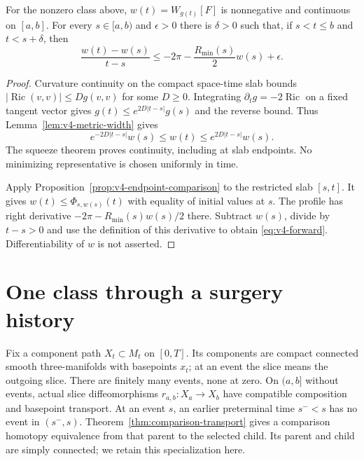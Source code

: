 \begin{proposition}
\label{prop:v4-smooth-time}
For the nonzero class above, $w(t)=W_{g(t)}[F]$ is nonnegative and
continuous on $[a,b]$. For every $s\in[a,b)$ and $\epsilon>0$ there
is $\delta>0$ such that, if $s<t\leq b$ and $t<s+\delta$, then
\begin{equation}
 \frac{w(t)-w(s)}{t-s}
 \leq-2\pi-\frac{R_{\min}(s)}2w(s)+\epsilon.
 \label{eq:v4-forward}
\end{equation}
\end{proposition}
\begin{proof}
Curvature continuity on the compact space-time slab bounds
$|\operatorname{Ric}(v,v)|\leq Dg(v,v)$ for some $D\geq0$.
Integrating $\partial_tg=-2\operatorname{Ric}$ on a fixed tangent
vector gives $g(t)\leq e^{2D|t-s|}g(s)$ and the reverse bound. Thus
Lemma~\ref{lem:v4-metric-width} gives
\[
 e^{-2D|t-s|}w(s)\leq w(t)\leq e^{2D|t-s|}w(s).
\]
The squeeze theorem proves continuity, including at slab endpoints.
No minimizing representative is chosen uniformly in time.

Apply Proposition~\ref{prop:v4-endpoint-comparison} to the restricted
slab $[s,t]$. It gives $w(t)\leq\Phi_{s,w(s)}(t)$ with equality of
initial values at $s$. The profile has right derivative
$-2\pi-R_{\min}(s)w(s)/2$ there. Subtract $w(s)$, divide by $t-s>0$
and use the definition of this derivative to obtain
\eqref{eq:v4-forward}. Differentiability of $w$ is not asserted.
\end{proof}

\section{One class through a surgery history}

Fix a component path $X_t\subset M_t$ on $[0,T]$. Its components are
compact connected smooth three-manifolds with basepoints $x_t$; at an
event the slice means the outgoing slice. There are finitely many events,
none at zero. On $(a,b]$ without events, actual slice diffeomorphisms
$r_{a,b}:X_a\to X_b$ have compatible composition and basepoint transport.
At an event $s$, an earlier preterminal time $s^-<s$ has no event in
$(s^-,s)$. Theorem~\ref{thm:comparison-transport} gives a comparison
homotopy equivalence from that parent to the selected child. Its parent
and child are simply connected; we retain this specialization here.

